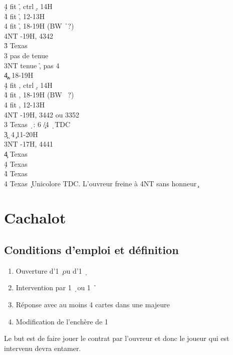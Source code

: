 \documentclass[a4paper]{article}
\begin{document}
\begin{bidtable}
4\d \> fit \h , ctrl \d , 14H\\
4\h \> fit \h , 12-13H\\
4\s \> fit \h , 18-19H (BW \h\ ?)\\
4NT -19H, 4342\-\\
3\h \> Texas \s \+\\
3\s \> pas de tenue \h \\
3NT \> tenue \h , pas 4\s \\
4\c {}\c , 18-19H\\
4\d \> fit \s , ctrl \d , 14H\\
4\h \> fit \s , 18-19H (BW \s\ ?)\\
4\s \> fit \s , 12-13H\\
4NT -19H, 3442 ou 3352\-\\
3\s \> Texas \d\ : 6 \c /4 \d\ TDC\-\\
3\c {}\d\ 4\c\ 11-20H\\
3NT -17H, 4441\+\\
4\c \> Texas \d \\
4\d \> Texas \h \\
4\h \> Texas \s \\
4\s \> Texas \c\ Unicolore TDC. L'ouvreur freine à 4NT sans honneur \c \-
\end{bidtable}

\section{Cachalot}

\subsection{Conditions d'emploi et définition}

\begin{enumerate}
\item Ouverture d’1 \c\ ou d’1 \d\ 

\item Intervention par 1 \d\ ou 1 \h\ 

\item Réponse avec au moins 4 cartes dans une majeure

\item Modification de l’enchère de 1 \s 

\end{enumerate}

Le but est de faire jouer le contrat par l’ouvreur et donc le joueur 
qui est intervenu devra entamer.
\end{document}
